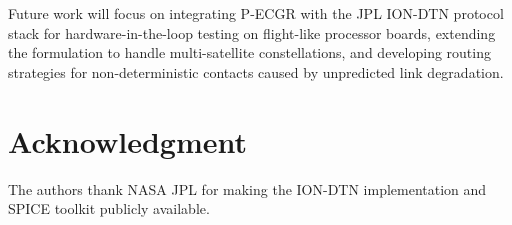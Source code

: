 \documentclass[journal,twocolumn]{IEEEtran}
\newcommand{\pecgr}{\textsf{P-ECGR}}
\begin{document}
Future work will focus on integrating \pecgr{} with the JPL ION-DTN protocol stack for hardware-in-the-loop testing on flight-like processor boards, extending the formulation to handle multi-satellite constellations, and developing routing strategies for non-deterministic contacts caused by unpredicted link degradation.

\section*{Acknowledgment}
The authors thank NASA JPL for making the ION-DTN implementation and SPICE toolkit publicly available.

\balance


\end{document}
